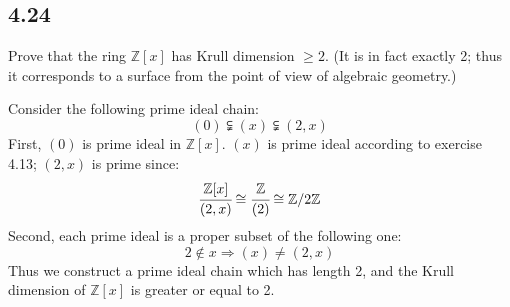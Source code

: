 \documentclass[a4paper, pdf, 12pt]{article}
\makeatletter
\renewenvironment{proof}[1][\proofname]{\par
  \pushQED{\qed}%
  \normalfont \topsep6\p@\@plus6\p@\relax
  \trivlist
  \item[%
    \hskip\labelsep
    \normalfont\bfseries %
    #1%
    \@addpunct{.}%
  ]\ignorespaces
}{%
  \popQED\endtrivlist\@endpefalse
}
\let\qed\relax %
\DeclareRobustCommand{\qed}{%
  \ifmmode \mathqed
  \else
    \leavevmode\unskip\penalty\@M\hbox{}\nobreak\hspace{.5em minus .1em}%
    \hbox{\qedsymbol}%
  \fi
}
\makeatother
\begin{document}
\subsection*{4.24}
Prove that the ring $\mathbb{Z}[x]$ has Krull dimension $\geq 2$. 
(It is in fact exactly 2; thus it corresponds to a surface from the point of view of algebraic geometry.)
\begin{proof}
  Consider the following prime ideal chain:
  $$
  (0)\subsetneqq (x) \subsetneqq (2, x)
  $$
  First, $(0)$ is prime ideal in $\mathbb{Z}[x]$. $(x)$ is prime ideal according to exercise
  4.13; $(2, x)$ is prime since:
  $$
  \cfrac{\mathbb{Z}[x]}{(2, x)}\cong \cfrac{\mathbb{Z}}{(2)}\cong \mathbb{Z}/2\mathbb{Z}
  $$
  Second, each prime ideal is a proper subset of the following one:
  $$
  2\notin x \Rightarrow (x)\neq (2,x) 
  $$
  Thus we construct a prime ideal chain which has length 2, and the Krull dimension of $\mathbb{Z}[x]$ is greater or 
  equal to 2.
\end{proof}
\end{document}

